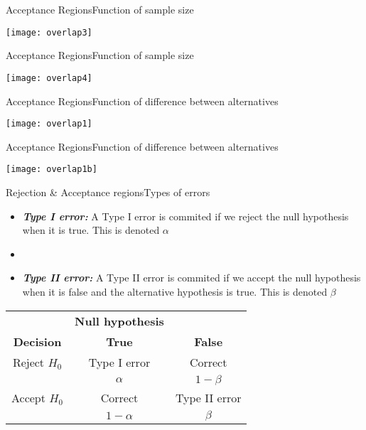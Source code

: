 \documentclass[xcolor=dvipsnames]{beamer}
\begin{document}
\begin{frame}{Acceptance Regions}{Function of sample size}
	\begin{center}
		\texttt{[image: overlap3]}
	\end{center}
\end{frame}

\begin{frame}{Acceptance Regions}{Function of sample size}
	\begin{center}
		\texttt{[image: overlap4]}
	\end{center}
\end{frame}

\begin{frame}{Acceptance Regions}{Function of difference between alternatives}
	\begin{center}
		\texttt{[image: overlap1]}
	\end{center}
\end{frame}

\begin{frame}{Acceptance Regions}{Function of difference between alternatives}
	\begin{center}
		\texttt{[image: overlap1b]}
	\end{center}
\end{frame}

\begin{frame}{Rejection \& Acceptance regions}{Types of errors}
	\begin{itemize}
		\item \textbf{\emph{Type I error:}} A Type I error is commited if we reject the null hypothesis when it is true. This is denoted $\alpha$
		\item[]
		\item \textbf{\emph{Type II error:}} A Type II error is commited if we accept the null hypothesis when it is false and the alternative hypothesis is true. This is denoted $\beta$
	\end{itemize}
	\begin{center}
		\begin{tabular}{c|cc}
			& \textbf{Null hypothesis} & \\
			\textbf{Decision} & \textbf{True} & \textbf{False} \\ \hline
			Reject $H_0$ & Type I error & Correct \\
			& $\alpha$ & $1-\beta$ \\ \hline
			Accept $H_0$ & Correct & Type II error \\
			& $1-\alpha$ & $\beta$ \\ \hline
		\end{tabular}
	\end{center}
\end{frame}
\end{document}
